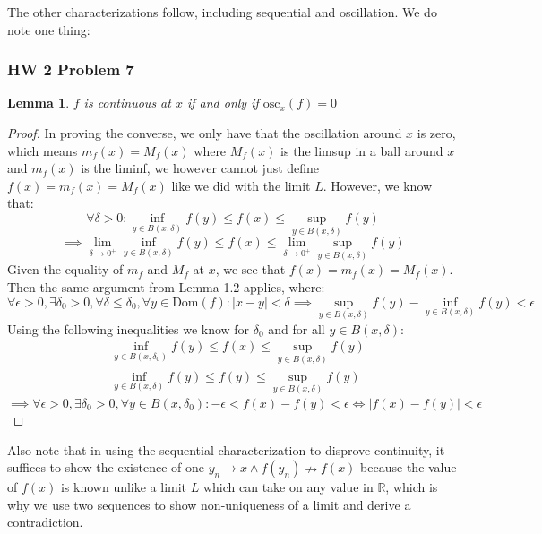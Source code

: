 \documentclass[10pt,letterpaper]{article} %
\newtheorem{lem}{Lemma}[section]
\begin{document}
The other characterizations follow, including sequential and oscillation. We do note one thing:
\subsubsection{HW 2 Problem 7}
\begin{lem}
$f$ is continuous at $x$ if and only if $\text{osc}_x(f) = 0$
\end{lem}
\begin{proof}
In proving the converse, we only have that the oscillation around $x$ is zero, which means $m_f(x) = M_f(x)$ where $M_f(x)$ is the limsup in a ball around $x$ and $m_f(x)$ is the liminf, we however cannot just define $f(x) = m_f(x) = M_f(x)$ like we did with the limit $L$. However, we know that:
\begin{equation*}
  \forall \delta > 0: \inf_{y \in B(x, \delta)}f(y) \leqslant f(x) \leqslant \sup_{y \in B(x, \delta)}f(y)
\end{equation*}
\begin{equation*}
\implies \lim_{\delta \xrightarrow{} 0^+}\inf_{y \in B(x, \delta)}f(y) \leqslant f(x) \leqslant \lim_{\delta \xrightarrow{} 0^+}\sup_{y \in B(x, \delta)}f(y)
\end{equation*}
Given the equality of $m_f$ and $M_f$ at $x$, we see that $f(x) = m_f(x) = M_f(x)$. Then the same argument from Lemma 1.2 applies, where:
\begin{equation*}
\forall \epsilon > 0, \exists \delta_0 >0, \forall \delta \leqslant \delta_0, \forall y \in \text{Dom}(f): |x-y| < \delta \implies \sup_{y \in B(x, \delta)}f(y) - \inf_{y \in B(x, \delta)}f(y) < \epsilon
\end{equation*}
Using the following inequalities we know for $\delta_0$ and for all $y \in B(x, \delta)$:
\begin{align*}
&\inf_{y \in B(x, \delta_0)}f(y) \leqslant f(x) \leqslant \sup_{y \in B(x, \delta)}f(y)\\
&\inf_{y \in B(x, \delta)}f(y) \leqslant f(y) \leqslant \sup_{y \in B(x, \delta)}f(y)
\end{align*}
\begin{equation*}
  \implies \forall \epsilon > 0, \exists \delta_0 > 0, \forall y \in B(x, \delta_0): - \epsilon < f(x) - f(y) < \epsilon \iff |f(x) - f(y)| < \epsilon
\end{equation*}
\end{proof}
Also note that in using the sequential characterization to disprove continuity, it suffices to show the existence of one $y_n \xrightarrow{} x \land f(y_n) \nrightarrow f(x)$ because the value of $f(x)$ is known unlike a limit $L$ which can take on any value in $\mathbb{R}$, which is why we use two sequences to show non-uniqueness of a limit and derive a contradiction.
\end{document}
